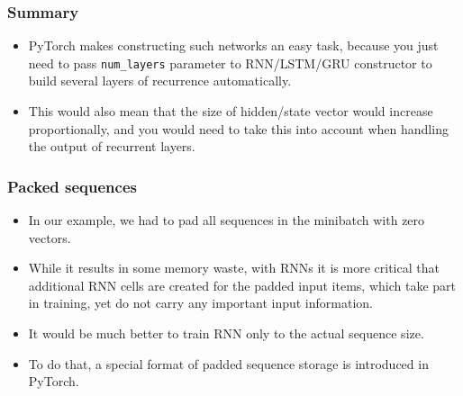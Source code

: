 \begin{frame}[fragile] \frametitle{Summary}

\begin{itemize}
\item PyTorch makes constructing such networks an easy task, because you just need to pass \lstinline|num_layers| parameter to RNN/LSTM/GRU constructor to build several layers of recurrence automatically. 
\item This would also mean that the size of hidden/state vector would increase proportionally, and you would need to take this into account when handling the output of recurrent layers.
\end{itemize}


\end{frame}


\begin{frame}[fragile] \frametitle{Packed sequences}

\begin{itemize}
\item In our example, we had to pad all sequences in the minibatch with zero vectors. 
\item While it results in some memory waste, with RNNs it is more critical that additional RNN cells are created for the padded input items, which take part in training, yet do not carry any important input information. 
\item It would be much better to train RNN only to the actual sequence size.
\item To do that, a special format of padded sequence storage is introduced in PyTorch. 
\end{itemize}



\end{frame}


